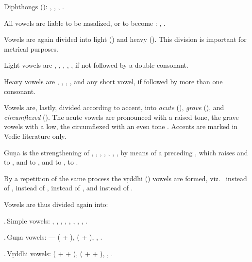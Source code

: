 \item Diphthongs (): , , ,
  .
\stopitemize

\s All vowels are liable to be nasalized, or to become :
, .

\s Vowels are again divided into light () and heavy
(). This division is important for metrical purposes.

\startitemize[n]
\item Light vowels are , , , ,
  , if not followed by a double consonant.

\item Heavy vowels are , , , , and
  any short vowel, if followed by more than one consonant.
\stopitemize

\s Vowels are, lastly, divided according to accent, into {\em acute}
(), {\em grave} (), and {\em circumflexed}
(). The acute vowels are pronounced with a raised tone, the
grave vowels with a low, the circumflexed with an even tone %
%
. Accents are marked in Vedic literature only.

\subject[gunavrddhi]{Guṇa and Vṛddhi.}

\s Guṇa is the strengthening of , , ,
, , , , by means of a
preceding , which raises  and  to ,
 and  to ,  and  to
,  to  %
%
.

By a repetition of the same process the vṛddhi () vowels
are formed, viz.\  instead of ,  instead of
,  instead of , and  instead
of  %
%
.

Vowels are thus divided again into:

\starttabulate[|l|c|c|c|c|c|]
.\,Simple vowels: \NC {}, , \NC {},
, \NC {}, , \NC {}, ,
\NC {}. \NC\NR

.\,Guṇa vowels: \NC — \NC {} ( + ), \NC
{} ( + ), \NC {}, \NC {}. \NC\NR

.\,Vṛddhi vowels: \NC {} \NC {} ( +  +
), \NC {} ( +  + ), \NC {}, \NC
{}. \NC\NR
\stoptabulate

